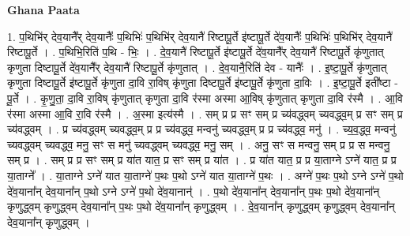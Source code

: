 \documentclass[17pt]{extarticle}
\begin{document}
\textbf{Ghana Paata } \newline

1. प॒थिभि॑र् देव॒यानै᳚र् देव॒यानैः᳚ प॒थिभिः॑ प॒थिभि॑र् देव॒यानै॑ रिष्टापू॒र्ते इ॑ष्टापू॒र्ते दे॑व॒यानैः᳚ प॒थिभिः॑ प॒थिभि॑र् देव॒यानै॑ रिष्टापू॒र्ते । . प॒थिभि॒रिति॑ प॒थि - भिः॒ । . दे॒व॒यानै॑ रिष्टापू॒र्ते इ॑ष्टापू॒र्ते दे॑व॒यानै᳚र् देव॒यानै॑ रिष्टापू॒र्ते कृ॑णुतात् कृणुता दिष्टापू॒र्ते दे॑व॒यानै᳚र् देव॒यानै॑ रिष्टापू॒र्ते कृ॑णुतात् । . दे॒व॒यानै॒रिति॑ देव - यानैः᳚ । . इ॒ष्टा॒पू॒र्ते कृ॑णुतात् कृणुता दिष्टापू॒र्ते इ॑ष्टापू॒र्ते कृ॑णुता दा॒वि रा॒विष् कृ॑णुता दिष्टापू॒र्ते इ॑ष्टापू॒र्ते कृ॑णुता दा॒विः । . इ॒ष्टा॒पू॒र्ते इती᳚ष्टा - पू॒र्ते । . कृ॒णु॒ता॒ दा॒वि रा॒विष् कृ॑णुतात् कृणुता दा॒वि र॑स्मा अस्मा आ॒विष् कृ॑णुतात् कृणुता दा॒वि र॑स्मै । . आ॒वि र॑स्मा अस्मा आ॒वि रा॒वि र॑स्मै । . अ॒स्मा इत्य॑स्मै । . सम् प्र प्र सꣳ सम् प्र च्य॑वद्ध्वम् च्यवद्ध्व॒म् प्र सꣳ सम् प्र च्य॑वद्ध्वम् । . प्र च्य॑वद्ध्वम् च्यवद्ध्व॒म् प्र प्र च्य॑वद्ध्व॒ मन्वनु॑ च्यवद्ध्व॒म् प्र प्र च्य॑वद्ध्व॒ मनु॑ । . च्य॒व॒द्ध्व॒ मन्वनु॑ च्यवद्ध्वम् च्यवद्ध्व॒ मनु॒ सꣳ स मनु॑ च्यवद्ध्वम् च्यवद्ध्व॒ मनु॒ सम् । . अनु॒ सꣳ स मन्वनु॒ सम् प्र प्र स मन्वनु॒ सम् प्र । . सम् प्र प्र सꣳ सम् प्र या॑त यात॒ प्र सꣳ सम् प्र या॑त । . प्र या॑त यात॒ प्र प्र या॒ताग्ने ऽग्ने॑ यात॒ प्र प्र या॒ताग्ने᳚ । . या॒ताग्ने ऽग्ने॑ यात या॒ताग्ने॑ प॒थः प॒थो ऽग्ने॑ यात या॒ताग्ने॑ प॒थः । . अग्ने॑ प॒थः प॒थो ऽग्ने ऽग्ने॑ प॒थो दे॑व॒याना᳚न् देव॒याना᳚न् प॒थो ऽग्ने ऽग्ने॑ प॒थो दे॑व॒यानान्॑ । . प॒थो दे॑व॒याना᳚न् देव॒याना᳚न् प॒थः प॒थो दे॑व॒याना᳚न् कृणुद्ध्वम् कृणुद्ध्वम् देव॒याना᳚न् प॒थः प॒थो दे॑व॒याना᳚न् कृणुद्ध्वम् । . दे॒व॒याना᳚न् कृणुद्ध्वम् कृणुद्ध्वम् देव॒याना᳚न् देव॒याना᳚न् कृणुद्ध्वम् । \newline
\end{document}
